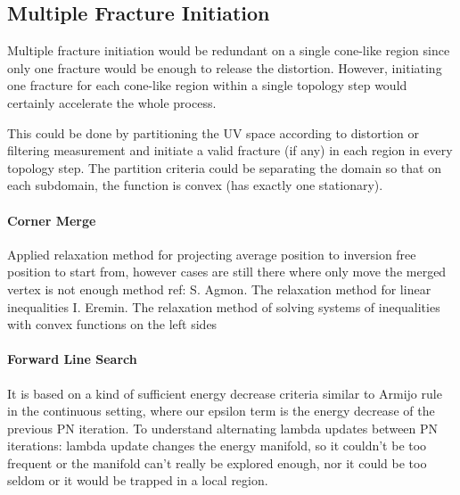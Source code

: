 


\subsection{Multiple Fracture Initiation}
\minchen{[TODO]}

Multiple fracture initiation would be redundant on a single cone-like region since only one fracture would be enough to release the distortion. However, initiating one fracture for each cone-like region within a single topology step would certainly accelerate the whole process.

This could be done by partitioning the UV space according to distortion or filtering measurement and initiate a valid fracture (if any) in each region in every topology step. The partition criteria could be separating the domain so that on each subdomain, the function is convex (has exactly one stationary).

\paragraph{Corner Merge} Applied relaxation method for projecting average position to inversion free position to start from, however cases are still there where only move the merged vertex is not enough
method ref:
S. Agmon. The relaxation method for linear inequalities
I. Eremin. The relaxation method of solving systems of inequalities with convex functions on the left sides

\paragraph{Forward Line Search} It is based on a kind of sufficient energy decrease criteria similar to Armijo rule in the continuous setting, where our epsilon term is the energy decrease of the previous PN iteration.
To understand alternating lambda updates between PN iterations: lambda update changes the energy manifold, so it couldn’t be too frequent or the manifold can’t really be explored enough, nor it could be too seldom or it would be trapped in a local region.
